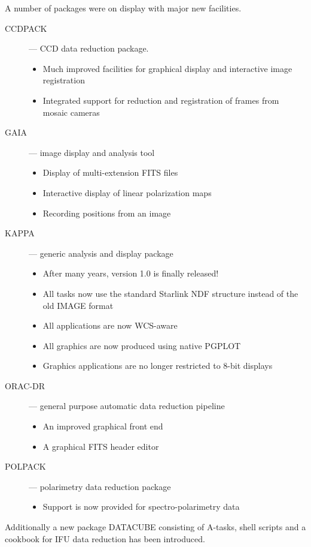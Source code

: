 A number of packages were on display with major new facilities.
\begin{description}

\item[CCDPACK] --- CCD data reduction package.
   \begin{itemize}
   \item Much improved facilities for graphical display and 
         interactive image registration
   \item Integrated support for reduction and registration of frames 
         from mosaic cameras
   \end{itemize}

\item[GAIA] --- image display and analysis tool
   \begin{itemize}
   \item Display of multi-extension FITS files
   \item Interactive display of linear polarization maps
   \item Recording positions from an image
   \end{itemize}

\item[KAPPA] --- generic analysis and display package
   \begin{itemize}
   \item After many years, version 1.0 is finally released!
   \item All tasks now use the standard Starlink NDF structure instead of
         the old IMAGE format
   \item All applications are now WCS-aware
   \item All graphics are now produced using native PGPLOT
   \item Graphics applications are no longer restricted to 8-bit displays
   \end{itemize}

\item[ORAC-DR] --- general purpose automatic data reduction pipeline
   \begin{itemize}
   \item An improved graphical front end
   \item A graphical FITS header editor
   \end{itemize}

\item[POLPACK] --- polarimetry data reduction package
   \begin{itemize}
   \item Support is now provided for spectro-polarimetry data
   \end{itemize}

\end{description}
Additionally a new package DATACUBE consisting of A-tasks, shell scripts
and a cookbook for IFU data reduction has been introduced.


